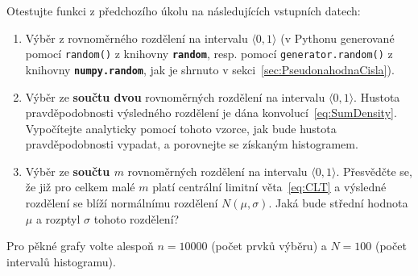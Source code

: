 \documentclass[a4paper,11pt,twoside]{article}
\def\code#1{\textnormal{\texttt{#1}}}
\def\file#1{\textnormal{\textbf{\texttt{#1}}}}
\theoremstyle{red}
\theoremstyle{green}
\begin{document}
    \begin{task}\label{task:Distributions}
        Otestujte funkci z předchozího úkolu na následujících vstupních datech:
        \begin{enumerate}
            \item
                Výběr z rovnoměrného rozdělení na intervalu $\langle 0,1\rangle$ (v Pythonu generované pomocí \code{random()} z knihovny \file{random}, resp. pomocí \code{generator.random()} z knihovny \file{numpy.random}, jak je shrnuto v sekci~\ref{sec:PseudonahodnaCisla}).
            \item
                Výběr ze {\bf součtu dvou} rovnoměrných rozdělení na intervalu $\langle 0,1\rangle$.
                Hustota pravděpodobnosti výsledného rozdělení je dána konvolucí~\eqref{eq:SumDensity}.
                Vypočítejte analyticky pomocí tohoto vzorce, jak bude hustota pravděpodobnosti vypadat, a porovnejte se získaným histogramem.
            \item
                Výběr ze {\bf součtu $m$} rovnoměrných rozdělení na intervalu $\langle 0,1\rangle$.
                Přesvědčte se, že již pro celkem malé $m$ platí centrální limitní věta~\eqref{eq:CLT} a výsledné rozdělení se blíží normálnímu rozdělení $N(\mu,\sigma)$.
                Jaká bude střední hodnota $\mu$ a rozptyl $\sigma$ tohoto rozdělení?
        \end{enumerate}
        Pro pěkné grafy volte alespoň $n=10000$ (počet prvků výběru) a $N=100$ (počet intervalů histogramu).
    \end{task}
    
\end{document}

